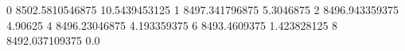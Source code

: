 0 8502.5810546875 10.5439453125
1 8497.341796875 5.3046875
2 8496.943359375 4.90625
4 8496.23046875 4.193359375
6 8493.4609375 1.423828125
8 8492.037109375 0.0
